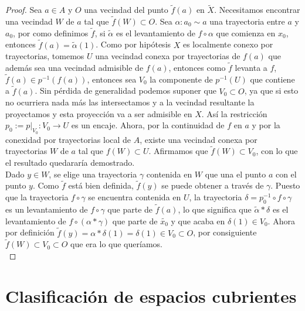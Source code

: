 \begin{proof}
Sea $a \in A$ y $O$ una vecindad del punto $\widetilde{f}(a)$ en $\widetilde{X}$. Necesitamos encontrar una vecindad $W$ de $a$ tal que $\widetilde{f}(W) \subset O$. Sea $\alpha:a_0 \sim a$ una trayectoria entre $a$ y $a_0$, por como definimos $\widetilde{f}$, si $\widetilde{\alpha}$ es el levantamiento de $f \circ \alpha$ que comienza en $x_0$, entonces $\widetilde{f}(a) = \widetilde{\alpha}(1)$. Como por hip\'otesis $X$ es localmente conexo por trayectorias, tomemos $U$ una vecindad conexa por trayectorias de $f(a)$ que adem\'as sea una vecindad admisible de $f(a)$, entonces como $\widetilde{f}$ levanta a $f$, $\widetilde{f}(a) \in p^{-1}(f(a))$, entonces sea $V_0$ la componente de $p^{-1}(U)$ que contiene a $\widetilde{f}(a)$. Sin p\'erdida de generalidad podemos suponer que $V_0 \subset O$, ya que si esto no ocurriera nada m\'as las intersectamos y a la vecindad resultante la proyectamos y esta proyecci\'on va a ser admisible en $X$. As\'i la restricci\'on $p_0:= p \vert_{V_0}: V_0 \rightarrow U$ es un encaje. Ahora, por la continuidad de $f$ en $a$ y por la conexidad por trayectorias local de $A$, existe una vecindad conexa por trayectorias $W$ de $a$ tal que $f(W) \subset U$. Afirmamos que $\widetilde{f}(W) \subset V_0$, con lo que el resultado quedarar\'ia demostrado.\\

Dado $y \in W$, se elige una trayectoria $\gamma$ contenida en $W$ que una el punto $a$ con el punto $y$. 
Como $\widetilde{f}$ est\'a bien definida, $\widetilde{f}(y)$ se puede obtener a trav\'es de $\gamma$. Puesto que la trayectoria $f \circ \gamma$ se encuentra contenida en $U$, la trayectoria 
$\delta= p_0^{-1} \circ f \circ \gamma$ es un levantamiento de $f \circ \gamma$ que parte de $\widetilde{f}(a)$, lo que significa que $\widetilde{\alpha} * \delta$ es el levantamiento de $f \circ (\alpha * \gamma)$ que parte de $\widetilde{x_0}$ y que acaba en $\delta (1) \in V_0$. Ahora por definici\'on $\widetilde{f}(y)=\alpha * \delta (1)= \delta (1) \in V_0 \subset O$, por consiguiente $\widetilde{f}(W) \subset V_0 \subset O$ que era lo que quer\'iamos.\\

\end{proof}


\section{Clasificaci\'on de espacios cubrientes}



